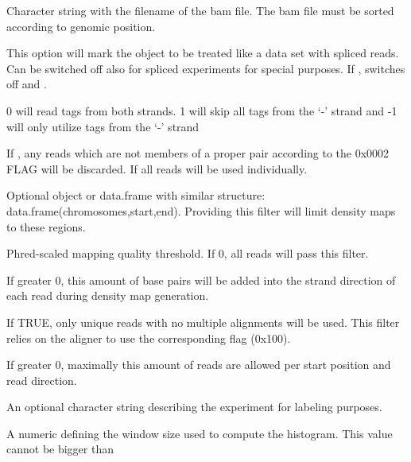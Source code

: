 \documentclass[letterpaper]{book}
\begin{document}
%
\begin{Arguments}
\begin{ldescription}
\item[\code{filename}] 
Character string with the filename of the bam file. The bam file must be sorted according to genomic position.

\item[\code{spliced}] 
This option will mark the object to be treated like a data set with spliced reads. Can be switched off also for spliced experiments for special purposes. If , switches off  and . 
 
\item[\code{read\_stranded}] 
0 will read tags from both strands. 1 will skip all tags from the `-' strand and -1 will only utilize tags from the `-' strand 

\item[\code{paired\_only}] 
If , any reads which are not members of a proper pair according to the 0x0002 FLAG will be discarded. If  all reads will be used individually.

\item[\code{set\_filter}] 
Optional  object or data.frame with similar structure: data.frame(chromosomes,start,end). Providing this filter will limit density maps to these regions.

\item[\code{min\_quality}] 
Phred-scaled mapping quality threshold. If 0, all reads will pass this filter.

\item[\code{extendreads}] 
If greater 0, this amount of base pairs will be added into the strand direction of each read during density map generation.

\item[\code{unique\_only}] 
If TRUE, only unique reads with no multiple alignments will be used. This filter relies on the aligner to use the corresponding flag (0x100).

\item[\code{max\_dups}] 
If greater 0, maximally this amount of reads are allowed per start position and read direction.
 
\item[\code{description}] 
An optional character string describing the experiment for labeling purposes.

\item[\code{hwindow}] 
A numeric defining the window size used to compute the histogram. This value cannot be bigger than 


\end{ldescription}
\end{Arguments}
\end{document}
